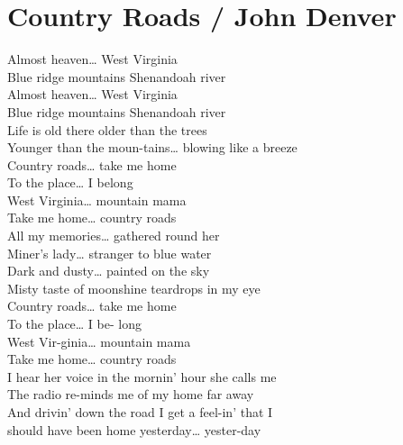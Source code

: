 \section{Country Roads / John Denver}\label{sec:countryroads}

\Aminor
\BflatMajor
\Cmajor
\Fmajor
\Gmajor
\Gseven

 Almost heaven…  West Virginia\\
 Blue ridge mountains  Shenandoah  river\\
 Almost heaven…  West Virginia\\
 Blue ridge mountains  Shenandoah  river\\
 Life is old there  older than the trees\\
 Younger than the moun-tains…  blowing like a  breeze\\

Country  roads… take me  home\\
To the  place… I belong\\
West Virginia… mountain  mama\\
Take me home… country  roads\\

 All my memories…  gathered round her\\
 Miner’s lady…  stranger to blue  water\\
 Dark and dusty…  painted on the sky\\
 Misty taste of moonshine  teardrops in my  eye\\

Country  roads… take me  home\\
To the  place… I be- long\\
West Vir-ginia… mountain  mama\\
Take me  home… country  roads\\

 I hear her  voice in the   mornin’ hour she calls me\\
The  radio re-minds me of my  home far away\\
And  drivin’ down the  road I get a feel-in’ that I\\
 should have been home  yesterday… yester-day\\


